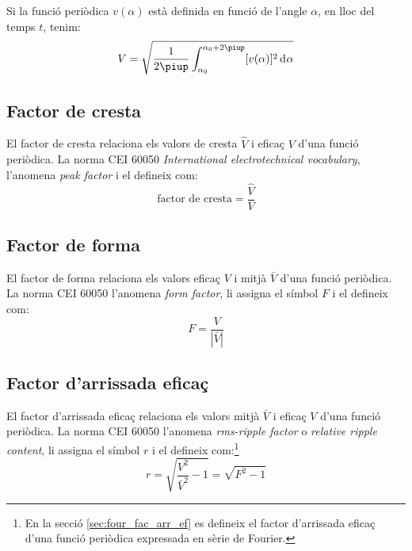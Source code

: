 Si la funció periòdica $v(\alpha)$ està definida en funció de
l'angle $\alpha$, en lloc del temps $t$, tenim:
\begin{equation}
    V = \sqrt{\frac{1}{2\piup} \int_{\alpha_0}^{\alpha_0+2\piup}
     [v(\alpha)]^2 \diff \alpha}
\end{equation}

\subsection{Factor de cresta}

El factor de cresta relaciona els valors de cresta $\hat{V}$
  i eficaç $V$ d'una funció periòdica. La norma CEI 60050 \textit{International electrotechnical vocabulary}, l'anomena \textit{peak factor} i el defineix com:
\begin{equation}
     \text{factor de cresta} = \frac{\hat{V}}{V}
\end{equation}

\subsection{Factor de forma}

El factor de forma relaciona els valors eficaç $V$
i mitjà $\bar{V}$ d'una funció periòdica. La norma CEI 60050 l'anomena \textit{form factor}, li assigna el símbol $F$ i el defineix com:
\begin{equation}
    F = \frac{V}{|\bar{V}|}
\end{equation}

\subsection{Factor d'arrissada eficaç}

El factor d'arrissada eficaç relaciona els
valors mitjà $\bar{V}$ i eficaç $V$ d'una funció periòdica.
La norma CEI 60050 l'anomena \textit{rms-ripple factor} o \textit{relative ripple content}, li assigna el símbol $r$ i el defineix com:\footnote{En la secció \ref{sec:four_fac_arr_ef} es defineix el factor d'arrissada eficaç d'una funció periòdica expressada en sèrie de Fourier.}
\begin{equation}
    r = \sqrt{\frac{V^2}{\bar{V}^2}-1} = \sqrt{F^2-1}\label{eq:rms_rip}
\end{equation}

